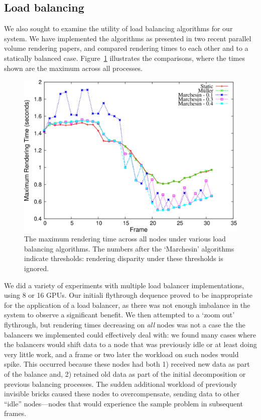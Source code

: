 \subsection{Load balancing}

We also sought to examine the utility of load balancing algorithms for
our system. We have implemented the algorithms as presented in two
recent parallel volume rendering papers, and compared rendering times
to each other and to a
statically balanced case.  Figure~\ref{fig:balance} illustrates
the comparisons, where the times shown are the maximum across all
processes.

\begin{figure}
  \includegraphics[width=\linewidth]{images/multiscale/balance}
  \caption{The maximum rendering time across all nodes under various
  load balancing algorithms.  The numbers after the `Marchesin'
  algorithms indicate thresholds: rendering disparity under these
  thresholds is ignored.}
  \label{fig:balance}
\end{figure}

We did a variety of experiments with multiple load balancer
implementations, using 8 or 16 GPUs.  Our initiali flythrough dequence
proved to be inappropriate for the application of a load balancer, as
there was not enough imbalance in the system to observe a significant
benefit.  We then attempted to
a `zoom out' flythrough, but rendering times decreasing on \emph{all}
nodes was not a case the the balancers we implemented could effectively
deal with: we found many cases where the balancers would shift data
to a node that was previously idle or at least doing very little
work, and a frame or two later the workload on such nodes would
spike.  This occurred because these nodes had both 1) received new
data as part of the balance and, 2) retained old data as part of the
initial decomposition or previous balancing processes.  The sudden
additional workload of previously invisible bricks caused these nodes
to overcompensate, sending data to other ``idle'' nodes---nodes that
would experience the sample problem in subsequent frames.

